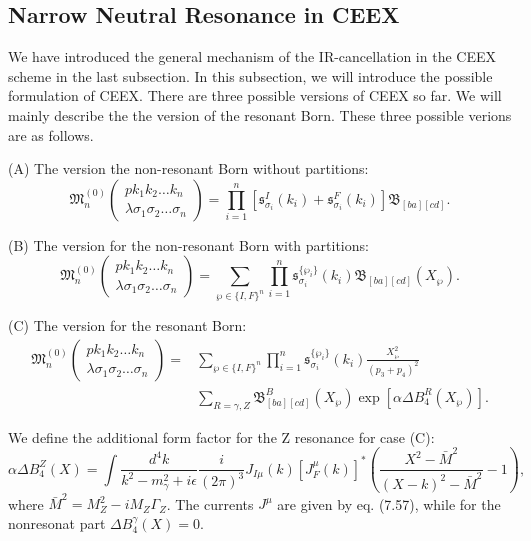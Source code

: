 \subsection{Narrow Neutral Resonance in CEEX}
We have introduced the general mechanism of the IR-cancellation in the CEEX scheme in the last subsection. In this subsection, we will introduce the possible formulation of CEEX. There are three possible versions of CEEX so far. We will mainly describe the the version of the resonant Born. These three possible verions are as follows.

(A) The version the non-resonant Born without partitions:
\begin{equation}
\mathfrak{M}^{(0)}_n\left(\begin{array}{c}
pk_1k_2\ldots k_n\\\lambda\sigma_1\sigma_2\ldots\sigma_n
\end{array}\right)=\prod_{i=1}^{n}[\mathfrak{s}^I_{\sigma_i}(k_i)+\mathfrak{s}^F_{\sigma_i}(k_i)]\mathfrak{B}_{[ba][cd]}.
\end{equation}

(B) The version for the non-resonant Born with partitions:
\begin{equation}
\mathfrak{M}^{(0)}_n\left(\begin{array}{c}
pk_1k_2\ldots k_n\\\lambda\sigma_1\sigma_2\ldots\sigma_n
\end{array}\right)=\sum_{\wp\in\{I,F\}^n}\prod_{i=1}^{n}\mathfrak{s}^{\{\wp_i\}}_{\sigma_i}(k_i)\mathfrak{B}_{[ba][cd]}(X_{\wp}).
\end{equation}

(C) The version for the resonant Born:
\begin{align}
\mathfrak{M}^{(0)}_n\left(\begin{array}{c}
pk_1k_2\ldots k_n\\\lambda\sigma_1\sigma_2\ldots\sigma_n
\end{array}\right)=&\sum_{\wp\in\{I,F\}^n}\prod_{i=1}^{n}\mathfrak{s}^{\{\wp_i\}}_{\sigma_i}(k_i)\frac{X^2_{\wp}}{(p_3+p_4)^2}\nonumber\\
&\sum_{R=\gamma,Z}\mathfrak{B}^B_{[ba][cd]}(X_{\wp})\exp[\alpha\Delta B^R_4(X_\wp)].
\end{align}

We define the additional form factor for the Z resonance for case (C):
\begin{equation}
\alpha\Delta B_4^Z(X)=\int\frac{d^4k}{k^2-m^2_\gamma+i\epsilon}\frac{i}{(2\pi)^3}J_{I\mu}(k)[J_{F}^\mu(k)]^\ast\left(\frac{X^2-\bar{M}^2}{(X-k)^2-\bar{M}^2}-1\right),
\end{equation}
where $\bar{M}^2=M_Z^2-iM_Z\Gamma_Z$. The currents $J^\mu$ are given by eq. (7.57), while for the nonresonat part $\Delta B^\gamma_4 (X)=0$.

